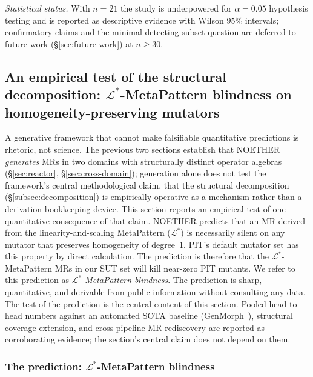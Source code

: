\documentclass[acmsmall,screen,review]{acmart}
\begin{document}
\emph{Statistical status.} With $n=21$ the study is underpowered for $\alpha=0.05$ hypothesis testing and is reported as descriptive evidence with Wilson 95\% intervals; confirmatory claims and the minimal-detecting-subset question are deferred to future work (\S\ref{sec:future-work}) at $n\ge 30$.

\subsection{An empirical test of the structural decomposition: \texorpdfstring{$\mathcal{L}^{*}$}{L*}-MetaPattern blindness on homogeneity-preserving mutators}
\label{sec:empirical-vs-sota}

A generative framework that cannot make falsifiable quantitative
predictions is rhetoric, not science. The previous two sections
establish that NOETHER \emph{generates} MRs in two domains with
structurally distinct operator algebras (\S\ref{sec:reactor},
\S\ref{sec:cross-domain}); generation alone does not test the
framework's central methodological claim, that the structural
decomposition (\S\ref{subsec:decomposition}) is empirically operative
as a mechanism rather than a derivation-bookkeeping device. This
section reports an empirical test of one quantitative consequence of
that claim. NOETHER predicts that an MR derived from the
linearity-and-scaling MetaPattern ($\mathcal{L}^{*}$) is necessarily silent
on any mutator that preserves homogeneity of degree~$1$. PIT's default
mutator set has this property by direct calculation. The prediction
is therefore that the $\mathcal{L}^{*}$-MetaPattern MRs in our SUT set will
kill near-zero PIT mutants. We refer to this prediction as
\emph{$\mathcal{L}^{*}$-MetaPattern blindness}. The prediction is sharp,
quantitative, and derivable from public information without consulting
any data. The test of the prediction is the central content of this
section. Pooled head-to-head numbers against an automated SOTA
baseline (GenMorph~\cite{GenMorph2024}), structural coverage
extension, and cross-pipeline MR rediscovery are reported as
corroborating evidence; the section's central claim does not depend
on them.

\subsubsection{The prediction: \texorpdfstring{$\mathcal{L}^{*}$}{L*}-MetaPattern blindness}
\label{subsec:l-blindness-derivation}
\end{document}
